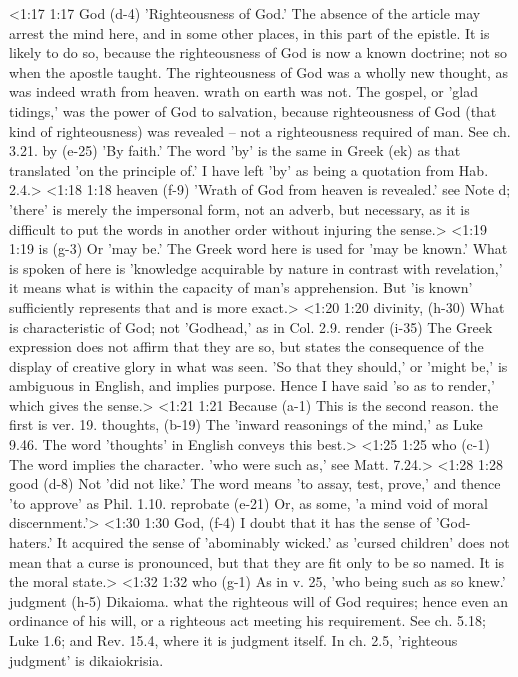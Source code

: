 <1:17 1:17  God (d-4)  'Righteousness of God.' The absence of the article may arrest  the mind here, and in some other places, in this part of the  epistle. It is likely to do so, because the righteousness of  God is now a known doctrine; not so when the apostle taught.  The righteousness of God was a wholly new thought, as was  indeed wrath from heaven. wrath on earth was not. The gospel,  or 'glad tidings,' was the power of God to salvation, because  righteousness of God (that kind of righteousness) was revealed  -- not a righteousness required of man. See ch. 3.21.  by (e-25)  'By faith.' The word 'by' is the same in Greek (ek) as that  translated 'on the principle of.' I have left 'by' as being a  quotation from Hab. 2.4.>
<1:18 1:18  heaven (f-9)  'Wrath of God from heaven is revealed.' see Note d; 'there'  is merely the impersonal form, not an adverb, but necessary, as  it is difficult to put the words in another order without  injuring the sense.>
<1:19 1:19  is (g-3)  Or 'may be.' The Greek word here is used for 'may be known.'  What is spoken of here is 'knowledge acquirable by nature in  contrast with revelation,' it means what is within the capacity  of man's apprehension. But 'is known' sufficiently represents  that and is more exact.>
<1:20 1:20  divinity, (h-30)  What is characteristic of God; not 'Godhead,' as in Col. 2.9.
  render (i-35)  The Greek expression does not affirm that they are so, but  states the consequence of the display of creative glory in  what was seen. 'So that they should,' or 'might be,' is  ambiguous in English, and implies purpose. Hence I have said  'so as to render,' which gives the sense.>
<1:21 1:21  Because (a-1)  This is the second reason. the first is ver. 19.
  thoughts, (b-19)  The 'inward reasonings of the mind,' as Luke 9.46. The word  'thoughts' in English conveys this best.>
<1:25 1:25  who (c-1)  The word implies the character. 'who were such as,' see Matt.  7.24.>
<1:28 1:28  good (d-8)  Not 'did not like.' The word means 'to assay, test, prove,'  and thence 'to approve' as Phil. 1.10.
  reprobate (e-21)  Or, as some, 'a mind void of moral discernment.'>
<1:30 1:30  God, (f-4)  I doubt that it has the sense of 'God-haters.' It acquired  the sense of 'abominably wicked.' as 'cursed children' does not  mean that a curse is pronounced, but that they are fit only to  be so named. It is the moral state.>
<1:32 1:32  who (g-1)  As in v. 25, 'who being such as so knew.'
  judgment (h-5)  Dikaioma. what the righteous will of God requires; hence  even an ordinance of his will, or a righteous act meeting his  requirement. See ch. 5.18; Luke 1.6; and Rev. 15.4, where it is  judgment itself. In ch. 2.5, 'righteous judgment' is  dikaiokrisia.
